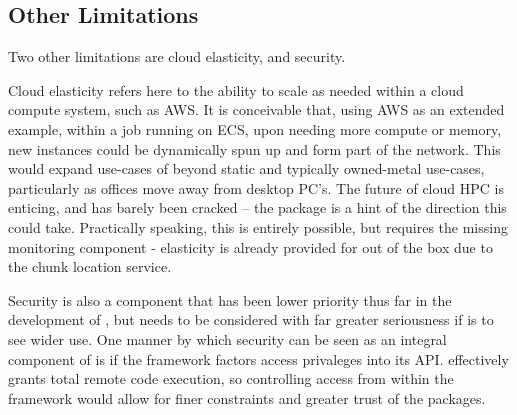 \subsection{Other Limitations}

Two other limitations are cloud elasticity, and security.

Cloud elasticity refers here to the ability to scale as needed within a cloud compute system, such as AWS.
It is conceivable that, using AWS as an extended example, within a job running on ECS, upon needing more compute or memory, new instances could be dynamically spun up and form part of the network.
This would expand use-cases of \lsr{} beyond static and typically owned-metal use-cases, particularly as offices move away from desktop PC's.
The future of cloud HPC is enticing, and has barely been cracked -- the package  is a hint of the direction this could take.
Practically speaking, this is entirely possible, but requires the missing monitoring component - elasticity is already provided for out of the box due to the chunk location service.

Security is also a component that has been lower priority thus far in the development of \lsr{}, but needs to be considered with far greater seriousness if \lsr{} is to see wider use.
One manner by which security can be seen as an integral component of \lsr{} is if the framework factors access privaleges into its API.
\lsr{} effectively grants total remote code execution, so controlling access from within the framework would allow for finer constraints and greater trust of the packages.

